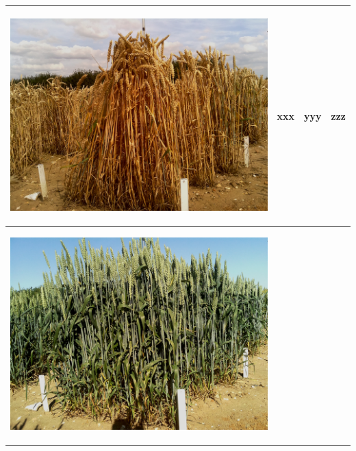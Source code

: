 \begin{table}[hp!]
\begin{tabular}{ | c | c | c | c |}
\begin{minipage}{.3\textwidth}
\begin{center}
		\includegraphics[width=\linewidth]{Images/004}
      \end{center}
    \end{minipage}
    &
      xxx
    & 
      yyy
    & 
      zzz
    \\ \hline
    \begin{minipage}{.3\textwidth}
      \begin{center}
		\includegraphics[width=\linewidth]{Images/005}

\end{center}
\end{minipage}
\end{tabular}
\end{table}
